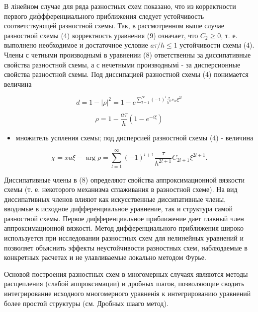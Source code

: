\documentclass[10pt]{article}
\begin{document}
В лінейном случае для ряда разностных схем показано, что из корректности первого диффференциального приближения следует устойчивость соответствующей разностной схемы. Так, в рассмотренном выше случае разностной схемы (4) корректность уравнения (9) означает, что $C_{2} \geqslant 0$, т. е. выполнено необходимое и достаточное условие $a \tau / h \leqslant 1$ устойчивости схемы (4). Члены с четными производнымі в уравнении (8) ответственны за диссипативные свойства разностной схемы, а с нечетными производнымі - за дисперсионные свойства разностной схемы. Под диссипацией разностной схемы (4) понимается величина



\[

d=1-|\rho|^{2}=1-e^{\sum_{l=1}^{\infty}(-1)^{l} \frac{\tau}{h^{2 l}} c_{2 l} \xi^{2 l}}

\]



\[

\rho=1-\frac{a \tau}{h}\left(1-e^{-i \xi}\right)

\]



\begin{itemize}

  \item множитель успления схемы; под дисперсией разностной схемы (4) - величина

\end{itemize}



\[

\chi=x a \xi-\arg \rho=\sum_{l=1}^{\infty}(-1)^{l+1} \frac{\tau}{h^{2 l+1}} C_{2 l+1} \xi^{2 l+1} .

\]



Диссипативные члены в (8) определяют свойства аппроксимационной вязкости схемы (т. е. некоторого механизма сглаживания в разностной схеме). На вид диссипативных членов влияют как искусственные диссипативные члены, вводимые в исходное дифференциальное уравнение, так и структура самой разностной схемы. Первое дифференциальное приближение дает главный член аппроксимационной вязкості. Метод дифференциального приближения широко используется при исследовании разностных схем для нелинейных уравнений и позволяет объяснить эффекты неустойчивости разностных схем, наблюдаемые в конкретных расчетах и не улавливаемые локально методом Фурье.



Основой построения разностных схем в многомерных случаях являются методы расщепления (слабой аппроксимации) и дробных шагов, позволяющие сводить интегрирование исходного многомерного уравненія к интегрированию уравнений более простой структуры (см. Дробных шааго метод).
\end{document}
